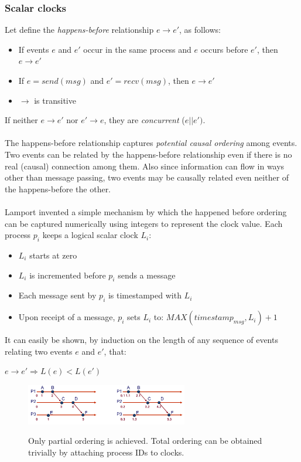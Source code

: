 \documentclass[10pt,a4paper]{article}
\begin{document}
\subsubsection{Scalar clocks}
Let define the \textit{happens-before} relationship $e \rightarrow e'$, as follows:
\begin{itemize}
	\item If events $e$ and $e'$ occur in the same process and $e$ occurs before $e'$, then $e \rightarrow e'$
	\item If $e=send(msg)$ and $e'=recv(msg)$, then $e \rightarrow e'$
	\item $\rightarrow$ is transitive
\end{itemize}
If neither $e \rightarrow e'$ nor $e' \rightarrow e$, they are \textit{concurrent} ($e || e')$. \\ \\ The happens-before relationship captures \textit{potential causal ordering} among events. Two events can be related by the happens-before relationship even if there is no real (causal) connection among them. Also since information can flow in ways other than message passing, two events may be causally related even neither of the happens-before the other. \\ \\ Lamport invented a simple mechanism by which the happened before ordering can be captured numerically using integers to represent the clock value.
Each process $p_i$ keeps a logical scalar clock $L_i$:
\begin{itemize}
	\item $L_i$ starts at zero
	\item $L_i$ is incremented before $p_i$ sends a message
	\item Each message sent by $p_i$ is timestamped with $L_i$
	\item Upon receipt of a message, $p_i$ sets $L_i$ to: $MAX(timestamp_{msg},L_i)+1$
\end{itemize} 
It can easily be shown, by induction on the length of any sequence of events relating two events $e$ and $e'$, that:
\begin{description}
	\item $e \rightarrow e' \Rightarrow L(e) < L(e')$
\end{description}
\begin{figure}[h!]
 \hfill \includegraphics[width=200pt]{images/scalar-clocks.png}\hspace*{\fill}
  \label{fig:scalar-clocks}
  \caption{Only partial ordering is achieved. Total ordering can be obtained trivially by attaching process IDs to clocks.}
\end{figure}
\end{document}

